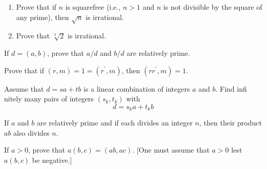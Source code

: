 \begin{questions}

\begin{solution}
    
\end{solution}


\question
    \begin{enumerate}[label=(\alph*)]
        \item Prove that if \(n\) is squarefree (i.e., \(n>1\) and \(n\) is not divisible by the square of any prime), then \(\sqrt{n}\) is irrational.
        \item Prove that \(\sqrt[3]{2}\) is irrational.
    \end{enumerate}


\begin{solution}
    
\end{solution}


\question
    If \(d=(a, b)\), prove that \(a / d\) and \(b / d\) are relatively prime.


\begin{solution}
    
\end{solution}


\question
    Prove that if \((r, m)=1=\left(r^{\prime}, m\right)\), then \(\left(r r^{\prime}, m\right)=1\).


\begin{solution}
    
\end{solution}


\question
    Assume that \(d=s a+t b\) is a linear combination of integers \(a\) and \(b\). Find infi nitely many pairs of integers \(\left(s_k, t_k\right)\) with
\[
d=s_k a+t_k b
\]


\begin{solution}
    
\end{solution}


\question
    If \(a\) and \(b\) are relatively prime and if each divides an integer \(n\), then their product \(a b\) also divides \(n\).


\begin{solution}
    
\end{solution}


\question
    If \(a>0\), prove that \(a(b, c)=(a b, a c)\). [One must assume that \(a>0\) lest \(a(b, c)\) be negative.]



\end{questions}
